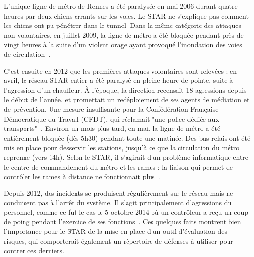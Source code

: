         L'unique ligne de métro de Rennes a été paralysée en mai 2006 durant quatre heures par deux chiens errants sur les voies. Le STAR ne s'explique pas comment les chiens ont pu pénétrer dans le tunnel. Dans la même catégorie des attaques non volontaires, en juillet 2009, la ligne de métro a été bloquée pendant près de vingt heures à la suite d'un violent orage ayant provoqué l'inondation des voies de circulation~\cite{metro_orage}.
        
        C'est ensuite en 2012 que les premières attaques volontaires sont relevées : en avril, le réseau STAR entier a été paralysé en pleine heure de pointe, suite à l'agression d'un chauffeur. À l'époque, la direction recensait 18 agressions depuis le début de l'année, et promettait un redéploiement de ses agents de médiation et de prévention. Une mesure insuffisante pour la Confédération Française Démocratique du Travail (CFDT), qui réclamait "une police dédiée aux transports"~\cite{bus_agression}. Environ un mois plus tard, en mai, la ligne de métro a été entièrement bloquée (dès 5h30) pendant toute une matinée. Des bus relais ont été mis en place pour desservir les stations, jusqu'à ce que la circulation du métro reprenne (vers 14h). Selon le STAR, il s’agirait d’un problème informatique entre le centre de commandement du métro et les rames : la liaison qui permet de contrôler les rames à distance ne fonctionnait plus~\cite{metro_info}. 
        
        Depuis 2012, des incidents se produisent régulièrement sur le réseau mais ne conduisent pas à l'arrêt du système. Il s'agit principalement d'agressions du personnel, comme ce fut le cas le 5 octobre 2014 où un contrôleur a reçu un coup de poing pendant l'exercice de ses fonctions~\cite{coup_poing_rennes}. Ces quelques faits montrent bien l'importance pour le STAR de la mise en place d'un outil d'évaluation des risques, qui comporterait également un répertoire de défenses à utiliser pour contrer ces derniers.
